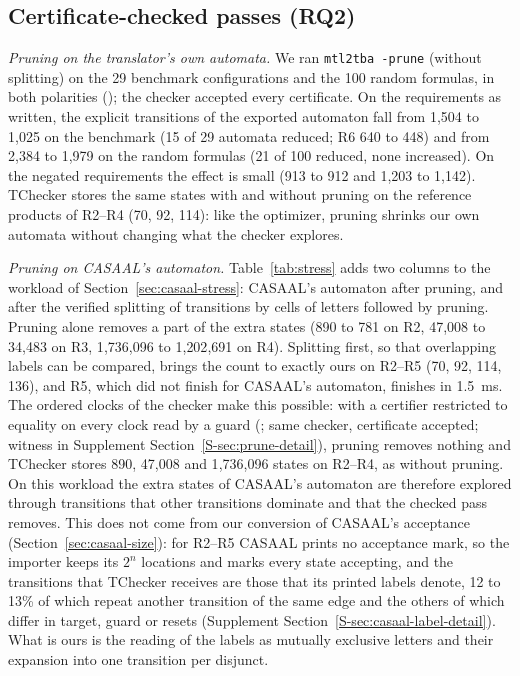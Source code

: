 \subsection{Certificate-checked passes (RQ2)}
\label{sec:eval-checked}
\emph{Pruning on the translator's own automata.} We ran \texttt{mtl2tba -prune} (without splitting) on the 29 benchmark configurations and the 100 random formulas, in both polarities (); the checker accepted every certificate. On the requirements as written, the explicit transitions of the exported automaton fall from 1{,}504 to 1{,}025 on the benchmark (15 of 29 automata reduced; R6 640 to 448) and from 2{,}384 to 1{,}979 on the random formulas (21 of 100 reduced, none increased). On the negated requirements the effect is small (913 to 912 and 1{,}203 to 1{,}142). TChecker stores the same states with and without pruning on the reference products of R2--R4 (70, 92, 114): like the optimizer, pruning shrinks our own automata without changing what the checker explores.

\emph{Pruning on CASAAL's automaton.} Table~\ref{tab:stress} adds two columns to the workload of Section~\ref{sec:casaal-stress}: CASAAL's automaton after pruning, and after the verified splitting of transitions by cells of letters followed by pruning. Pruning alone removes a part of the extra states (890 to 781 on R2, 47{,}008 to 34{,}483 on R3, 1{,}736{,}096 to 1{,}202{,}691 on R4). Splitting first, so that overlapping labels can be compared, brings the count to exactly ours on R2--R5 (70, 92, 114, 136), and R5, which did not finish for CASAAL's automaton, finishes in 1.5~ms. The ordered clocks of the checker make this possible: with a certifier restricted to equality on every clock read by a guard (; same checker, certificate accepted; witness in Supplement Section~\ref{S-sec:prune-detail}), pruning removes nothing and TChecker stores 890, 47{,}008 and 1{,}736{,}096 states on R2--R4, as without pruning. On this workload the extra states of CASAAL's automaton are therefore explored through transitions that other transitions dominate and that the checked pass removes. This does not come from our conversion of CASAAL's acceptance (Section~\ref{sec:casaal-size}): for R2--R5 CASAAL prints no acceptance mark, so the importer keeps its $2^n$ locations and marks every state accepting, and the transitions that TChecker receives are those that its printed labels denote, 12 to 13\% of which repeat another transition of the same edge and the others of which differ in target, guard or resets (Supplement Section~\ref{S-sec:casaal-label-detail}). What is ours is the reading of the labels as mutually exclusive letters and their expansion into one transition per disjunct.

